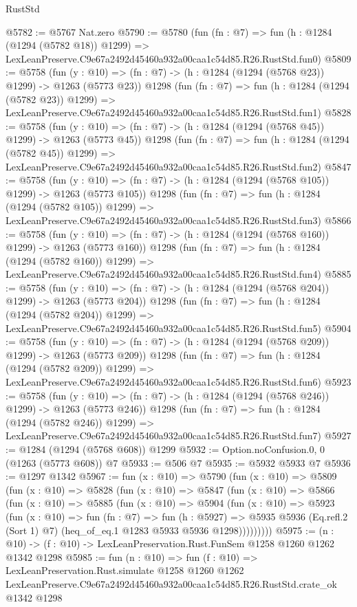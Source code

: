 \begin{lexlean}{RustStd}
\begin{coremodule}
@5782 := @5767 Nat.zero
@5790 := @5780
    (fun (fn : @7) =>
    fun (h : @1284 (@1294 (@5782 @18)) @1299) =>
    LexLeanPreserve.C9e67a2492d45460a932a00caa1c54d85.R26.RustStd.fun0)
@5809 := @5758
    (fun (y : @10) => (fn : @7) -> (h : @1284 (@1294 (@5768 @23)) @1299) -> @1263 (@5773 @23))
    @1298
    (fun (fn : @7) =>
    fun (h : @1284 (@1294 (@5782 @23)) @1299) =>
    LexLeanPreserve.C9e67a2492d45460a932a00caa1c54d85.R26.RustStd.fun1)
@5828 := @5758
    (fun (y : @10) => (fn : @7) -> (h : @1284 (@1294 (@5768 @45)) @1299) -> @1263 (@5773 @45))
    @1298
    (fun (fn : @7) =>
    fun (h : @1284 (@1294 (@5782 @45)) @1299) =>
    LexLeanPreserve.C9e67a2492d45460a932a00caa1c54d85.R26.RustStd.fun2)
@5847 := @5758
    (fun (y : @10) => (fn : @7) -> (h : @1284 (@1294 (@5768 @105)) @1299) -> @1263 (@5773 @105))
    @1298
    (fun (fn : @7) =>
    fun (h : @1284 (@1294 (@5782 @105)) @1299) =>
    LexLeanPreserve.C9e67a2492d45460a932a00caa1c54d85.R26.RustStd.fun3)
@5866 := @5758
    (fun (y : @10) => (fn : @7) -> (h : @1284 (@1294 (@5768 @160)) @1299) -> @1263 (@5773 @160))
    @1298
    (fun (fn : @7) =>
    fun (h : @1284 (@1294 (@5782 @160)) @1299) =>
    LexLeanPreserve.C9e67a2492d45460a932a00caa1c54d85.R26.RustStd.fun4)
@5885 := @5758
    (fun (y : @10) => (fn : @7) -> (h : @1284 (@1294 (@5768 @204)) @1299) -> @1263 (@5773 @204))
    @1298
    (fun (fn : @7) =>
    fun (h : @1284 (@1294 (@5782 @204)) @1299) =>
    LexLeanPreserve.C9e67a2492d45460a932a00caa1c54d85.R26.RustStd.fun5)
@5904 := @5758
    (fun (y : @10) => (fn : @7) -> (h : @1284 (@1294 (@5768 @209)) @1299) -> @1263 (@5773 @209))
    @1298
    (fun (fn : @7) =>
    fun (h : @1284 (@1294 (@5782 @209)) @1299) =>
    LexLeanPreserve.C9e67a2492d45460a932a00caa1c54d85.R26.RustStd.fun6)
@5923 := @5758
    (fun (y : @10) => (fn : @7) -> (h : @1284 (@1294 (@5768 @246)) @1299) -> @1263 (@5773 @246))
    @1298
    (fun (fn : @7) =>
    fun (h : @1284 (@1294 (@5782 @246)) @1299) =>
    LexLeanPreserve.C9e67a2492d45460a932a00caa1c54d85.R26.RustStd.fun7)
@5927 := @1284 (@1294 (@5768 @608)) @1299
@5932 := Option.noConfusion.{0, 0} (@1263 (@5773 @608)) @7
@5933 := @506 @7
@5935 := @5932 @5933 @7
@5936 := @1297 @1342
@5967 := fun (x : @10) =>
  @5790
    (fun (x : @10) =>
    @5809
      (fun (x : @10) =>
      @5828
        (fun (x : @10) =>
        @5847
          (fun (x : @10) =>
          @5866
            (fun (x : @10) =>
            @5885
              (fun (x : @10) =>
              @5904
                (fun (x : @10) =>
                @5923
                  (fun (x : @10) =>
                  fun (fn : @7) =>
                  fun (h : @5927) =>
                  @5935
                    @5936
                    (Eq.refl.{2} (Sort 1) @7)
                    (heq_of_eq.{1} @1283 @5933 @5936 @1298)))))))))
@5975 := (n : @10) -> (f : @10) -> LexLeanPreservation.Rust.FunSem @1258 @1260 @1262 @1342 @1298
@5985 := fun (n : @10) =>
  fun (f : @10) =>
  LexLeanPreservation.Rust.simulate
    @1258
    @1260
    @1262
    LexLeanPreserve.C9e67a2492d45460a932a00caa1c54d85.R26.RustStd.crate_ok
    @1342
    @1298
\end{coremodule}
\end{lexlean}
